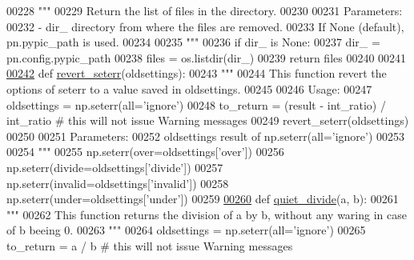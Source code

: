 \begin{DoxyCode}
{{{{00228     \textcolor{stringliteral}{"""}
00229 \textcolor{stringliteral}{    Return the list of files in the directory.}
00230 \textcolor{stringliteral}{}
00231 \textcolor{stringliteral}{    Parameters:}
00232 \textcolor{stringliteral}{        - dir\_     directory from where the files are removed. }
00233 \textcolor{stringliteral}{                   If None (default), pn.pypic\_path is used.}
00234 \textcolor{stringliteral}{}
00235 \textcolor{stringliteral}{    """}
00236     \textcolor{keywordflow}{if} dir\_ \textcolor{keywordflow}{is} \textcolor{keywordtype}{None}:
00237         dir\_ = pn.config.pypic\_path
00238     files = os.listdir(dir\_)
00239     \textcolor{keywordflow}{return} files
00240 
00241 
\hypertarget{misc_8py_source_l00242}{}\hyperlink{namespacepyneb_1_1utils_1_1misc_adadbbcc030d1e6da419e5c7af03f5a2d}{00242} \textcolor{keyword}{def }\hyperlink{namespacepyneb_1_1utils_1_1misc_adadbbcc030d1e6da419e5c7af03f5a2d}{revert\_seterr}(oldsettings):
00243     \textcolor{stringliteral}{"""}
00244 \textcolor{stringliteral}{    This function revert the options of seterr to a value saved in oldsettings.}
00245 \textcolor{stringliteral}{    }
00246 \textcolor{stringliteral}{    Usage:}
00247 \textcolor{stringliteral}{        oldsettings = np.seterr(all='ignore')}
00248 \textcolor{stringliteral}{        to\_return = (result - int\_ratio) / int\_ratio # this will not issue Warning messages}
00249 \textcolor{stringliteral}{        revert\_seterr(oldsettings)}
00250 \textcolor{stringliteral}{}
00251 \textcolor{stringliteral}{    Parameters:}
00252 \textcolor{stringliteral}{        oldsettings  result of np.seterr(all='ignore')}
00253 \textcolor{stringliteral}{}
00254 \textcolor{stringliteral}{    """}
00255     np.seterr(over=oldsettings[\textcolor{stringliteral}{'over'}])
00256     np.seterr(divide=oldsettings[\textcolor{stringliteral}{'divide'}])
00257     np.seterr(invalid=oldsettings[\textcolor{stringliteral}{'invalid'}])
00258     np.seterr(under=oldsettings[\textcolor{stringliteral}{'under'}])
00259 
\hypertarget{misc_8py_source_l00260}{}\hyperlink{namespacepyneb_1_1utils_1_1misc_afa4163f24be7b1472200c24824c72ae1}{00260} \textcolor{keyword}{def }\hyperlink{namespacepyneb_1_1utils_1_1misc_afa4163f24be7b1472200c24824c72ae1}{quiet\_divide}(a, b):
00261     \textcolor{stringliteral}{"""}
00262 \textcolor{stringliteral}{    This function returns the division of a by b, without any waring in case of b beeing 0.}
00263 \textcolor{stringliteral}{    """}
00264     oldsettings = np.seterr(all=\textcolor{stringliteral}{'ignore'})
00265     to\_return = a / b \textcolor{comment}{# this will not issue Warning messages}
}}}}
\end{DoxyCode}
